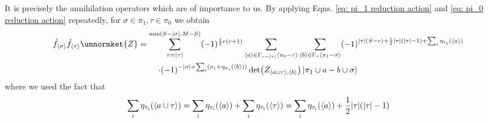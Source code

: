 \documentclass[12pt]{article}
\newcommand{\seq}[1]{\langle #1\rangle}
\begin{document}
	It is precisely the annihilation operators which are of importance to us. By applying Eqns. \ref{eq: pi_1 reduction action} and \ref{eq: pi_0 reduction action} repeatedly, for $\sigma\in\pi_1, \tau\in\pi_0$ we obtain
	\begin{multline} \label{eq: general reduction action}
	\hat{f}_{\seq{\sigma}}\hat{f}_{\seq{\tau}}\unnormket{Z}=\sum_{r=\abs{\tau}}^{\min(S-\abs{\sigma}, M-S)}(-1)^{\frac{1}{2}r(r+1)}\sum_{\seq{a}\in\Gamma_{r-\abs{\tau}}\seq{\pi_0-\tau}}\sum_{\seq{b}\in\Gamma_r\seq{\pi_1-\sigma}}(-1)^{\abs{\tau}(S-r)+\frac{1}{2}\abs{\tau}(\abs{\tau}-1)+\sum_i\eta_{\tau_i}(\seq{a})}\\
	\cdot (-1)^{-\abs{\sigma}+\sum_i(\sigma_i+\eta_{\sigma_i}(\seq{b}))}\det(Z_{\seq{a\cup\tau},\seq{b}})\ket{\pi_1\cup a-b\cup\sigma}
	\end{multline}
	where we used the fact that
	\begin{equation}
	\sum_i\eta_{\tau_i}(\seq{a\cup\tau})=\sum_i\eta_{\tau_i}(\seq{a})+\sum_i\eta_{\tau_i}(\seq{\tau})=\sum_i\eta_{\tau_i}(\seq{a})+\frac{1}{2}\abs{\tau}(\abs{\tau}-1)
	\end{equation}
	
\end{document}
